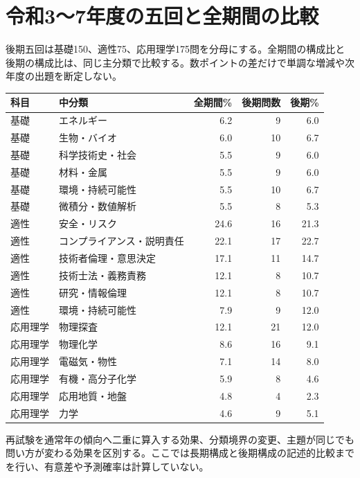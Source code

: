\section{令和3〜7年度の五回と全期間の比較}
後期五回は基礎150、適性75、応用理学175問を分母にする。全期間の構成比と後期の構成比は、同じ主分類で比較する。数ポイントの差だけで単調な増減や次年度の出題を断定しない。
\begin{longtable}{lp{.40\linewidth}rrr}
科目 & 中分類 & 全期間\% & 後期問数 & 後期\%\\\hline
基礎 & エネルギー & 6.2 & 9 & 6.0\\
基礎 & 生物・バイオ & 6.0 & 10 & 6.7\\
基礎 & 科学技術史・社会 & 5.5 & 9 & 6.0\\
基礎 & 材料・金属 & 5.5 & 9 & 6.0\\
基礎 & 環境・持続可能性 & 5.5 & 10 & 6.7\\
基礎 & 微積分・数値解析 & 5.5 & 8 & 5.3\\
適性 & 安全・リスク & 24.6 & 16 & 21.3\\
適性 & コンプライアンス・説明責任 & 22.1 & 17 & 22.7\\
適性 & 技術者倫理・意思決定 & 17.1 & 11 & 14.7\\
適性 & 技術士法・義務責務 & 12.1 & 8 & 10.7\\
適性 & 研究・情報倫理 & 12.1 & 8 & 10.7\\
適性 & 環境・持続可能性 & 7.9 & 9 & 12.0\\
応用理学 & 物理探査 & 12.1 & 21 & 12.0\\
応用理学 & 物理化学 & 8.6 & 16 & 9.1\\
応用理学 & 電磁気・物性 & 7.1 & 14 & 8.0\\
応用理学 & 有機・高分子化学 & 5.9 & 8 & 4.6\\
応用理学 & 応用地質・地盤 & 4.8 & 4 & 2.3\\
応用理学 & 力学 & 4.6 & 9 & 5.1\\
\end{longtable}
再試験を通常年の傾向へ二重に算入する効果、分類境界の変更、主題が同じでも問い方が変わる効果を区別する。ここでは長期構成と後期構成の記述的比較までを行い、有意差や予測確率は計算していない。
